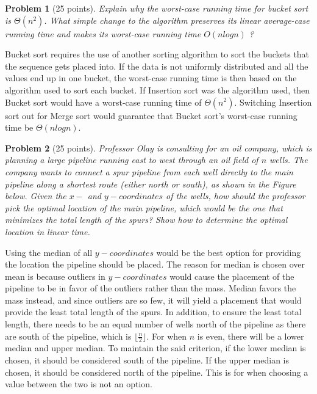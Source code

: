 \documentclass[11pt]{article}
\newtheorem{problem}{Problem}
\begin{document}

\begin{problem}[25 points]
\label{prob:3}
Explain why the worst-case running time for bucket sort is $\Theta(n^2)$. What simple change to the
algorithm preserves its linear average-case running time and makes its worst-case running time $O(n log n)$ ?
\end{problem}

Bucket sort requires the use of another sorting algorithm to sort the buckets that the sequence gets placed into. If the data is not uniformly distributed and all the values end up in one bucket, the worst-case running time is then based on the algorithm used to sort each bucket. If Insertion sort was the algorithm used, then Bucket sort would have a worst-case running time of $\Theta(n^2)$. Switching Insertion sort out for Merge sort would guarantee that Bucket sort's worst-case running time be $\Theta(nlogn)$.



\begin{problem}[25 points]
\label{prob:4}
Professor Olay is consulting for an oil company, which is planning a large pipeline running
east to west through an oil field of $n$ wells. The company wants to connect a spur pipeline from each well directly to the main pipeline along a shortest route (either north or south), as shown in the Figure below. Given the $x-$ and $y-coordinates$ of the wells, how should the professor pick the optimal location of the main pipeline, which would be the one that minimizes the total length of the spurs? Show how to determine the optimal location in linear time.
\end{problem}


Using the median of all $y-coordinates$ would be the best option for providing the location the pipeline should be placed. The reason for median is chosen over mean is because outliers in $y-coordinates$ would cause the placement of the pipeline to be in favor of the outliers rather than the mass. Median favors the mass instead, and since outliers are so few, it will yield a placement that would provide the least total length of the spurs. In addition, to ensure the least total length, there needs to be an equal number of wells north of the pipeline as there are south of the pipeline, which is $\lfloor\frac{n}{2}\rfloor$. For when $n$ is even, there will be a lower median and upper median. To maintain the said criterion, if the lower median is chosen, it should be considered south of the pipeline. If the upper median is chosen, it should be considered north of the pipeline. This is for when choosing a value between the two is not an option. 
\end{document}
